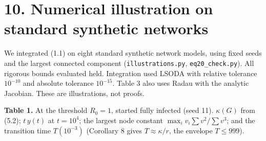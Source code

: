\documentclass[
  11pt,
  a4paper,
]{article}
\begin{document}
\section{10. Numerical illustration on standard synthetic
networks}\label{numerical-illustration-on-standard-synthetic-networks}

We integrated (1.1) on eight standard synthetic network models, using
fixed seeds and the largest connected component
(\texttt{illustrations.py}, \texttt{eq20\_check.py}). All rigorous
bounds evaluated held. Integration used LSODA with relative tolerance
\(10^{-10}\) and absolute tolerance \(10^{-15}\). Table 3 also uses
Radau with the analytic Jacobian. These are illustrations, not proofs.

\textbf{Table 1.} At the threshold \(R_0=1\), started fully infected
(seed 11). \(\kappa(G)\) from (5.2); \(t\,y(t)\) at \(t=10^4\); the
largest node constant \(\max_iv_i\sum v^2/\sum v^3\); and the transition
time \(T(10^{-3})\) (Corollary 8 gives \(T\approx\kappa/r\), the
envelope \(T\le999\)).
\end{document}
